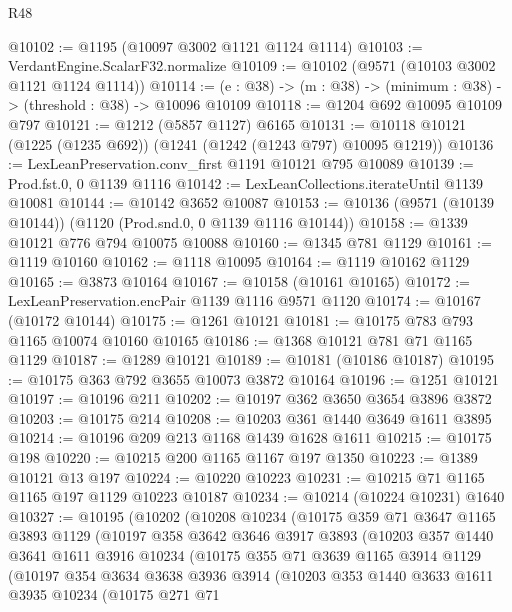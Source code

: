 \begin{lexlean}{R48}
\begin{coremodule}
@10102 := @1195 (@10097 @3002 @1121 @1124 @1114)
@10103 := VerdantEngine.ScalarF32.normalize
@10109 := @10102 (@9571 (@10103 @3002 @1121 @1124 @1114))
@10114 := (e : @38) -> (m : @38) -> (minimum : @38) -> (threshold : @38) -> @10096 @10109
@10118 := @1204 @692 @10095 @10109 @797
@10121 := @1212 (@5857 @1127) @6165
@10131 := @10118 @10121 (@1225 (@1235 @692)) (@1241 (@1242 (@1243 @797) @10095 @1219))
@10136 := LexLeanPreservation.conv_first @1191 @10121 @795 @10089
@10139 := Prod.fst.{0, 0} @1139 @1116
@10142 := LexLeanCollections.iterateUntil @1139 @10081
@10144 := @10142 @3652 @10087
@10153 := @10136 (@9571 (@10139 @10144)) (@1120 (Prod.snd.{0, 0} @1139 @1116 @10144))
@10158 := @1339 @10121 @776 @794 @10075 @10088
@10160 := @1345 @781 @1129
@10161 := @1119 @10160
@10162 := @1118 @10095
@10164 := @1119 @10162 @1129
@10165 := @3873 @10164
@10167 := @10158 (@10161 @10165)
@10172 := LexLeanPreservation.encPair @1139 @1116 @9571 @1120
@10174 := @10167 (@10172 @10144)
@10175 := @1261 @10121
@10181 := @10175 @783 @793 @1165 @10074 @10160 @10165
@10186 := @1368 @10121 @781 @71 @1165 @1129
@10187 := @1289 @10121
@10189 := @10181 (@10186 @10187)
@10195 := @10175 @363 @792 @3655 @10073 @3872 @10164
@10196 := @1251 @10121
@10197 := @10196 @211
@10202 := @10197 @362 @3650 @3654 @3896 @3872
@10203 := @10175 @214
@10208 := @10203 @361 @1440 @3649 @1611 @3895
@10214 := @10196 @209 @213 @1168 @1439 @1628 @1611
@10215 := @10175 @198
@10220 := @10215 @200 @1165 @1167 @197 @1350
@10223 := @1389 @10121 @13 @197
@10224 := @10220 @10223
@10231 := @10215 @71 @1165 @1165 @197 @1129 @10223 @10187
@10234 := @10214 (@10224 @10231) @1640
@10327 := @10195
    (@10202
      (@10208
        @10234
        (@10175
          @359
          @71
          @3647
          @1165
          @3893
          @1129
          (@10197
            @358
            @3642
            @3646
            @3917
            @3893
            (@10203
              @357
              @1440
              @3641
              @1611
              @3916
              @10234
              (@10175
                @355
                @71
                @3639
                @1165
                @3914
                @1129
                (@10197
                  @354
                  @3634
                  @3638
                  @3936
                  @3914
                  (@10203
                    @353
                    @1440
                    @3633
                    @1611
                    @3935
                    @10234
                    (@10175
                      @271
                      @71

\end{coremodule}
\end{lexlean}
